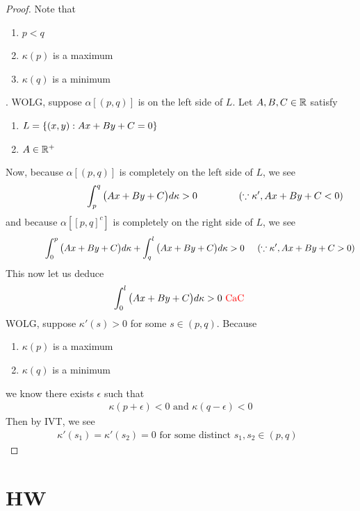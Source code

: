 \documentclass{report}
\begin{document}
\begin{proof}
Note that 
\begin{enumerate}[label=(\alph*)]
  \item $p<q$
  \item $\kappa(p)$ is a maximum 
  \item $\kappa(q)$ is a minimum
\end{enumerate}
. WOLG, suppose $\alpha [(p,q)]$ is on the left side of $L$. Let $A,B,C \in\mathbb{R}$ satisfy 
\begin{enumerate}[label=(\alph*)]
  \item $L=\{ (x,y):Ax+By+C=0 \}$ 
  \item $A\in\mathbb{R}^+$
\end{enumerate}
Now, because $\alpha [(p,q)]$ is completely on the left side of $L$, we see 
\begin{align*}
\hspace{2.5cm}\int_p^q \big(Ax+By+C \big)d\kappa > 0\hspace{1.5cm}(\because \kappa',Ax+By+C<0)
\end{align*}
and because $\alpha [[p,q]^c]$ is completely on the right side of $L$, we see 
\begin{align*}
\hspace{1.5cm}\int_0^p \big(Ax+By+C \big)d\kappa + \int_q^l \big(Ax+By+C \big)d\kappa >0\hspace{0.5cm}(\because \kappa',Ax+By+C>0)
\end{align*}
This now let us deduce 
\begin{align*}
\int_0^l \big(Ax+By+C \big)d\kappa >0 \text{ \textcolor{red}{CaC} }
\end{align*}
WOLG, suppose $\kappa'(s)>0$ for some $s \in (p,q)$. Because 
\begin{enumerate}[label=(\alph*)]
  \item $\kappa(p)$ is a maximum
  \item $\kappa(q)$ is a minimum 
\end{enumerate}
we know there exists $\epsilon $ such that 
\begin{align*}
\kappa(p+\epsilon )<0\text{ and }\kappa(q-\epsilon )<0
\end{align*}
Then by IVT, we see 
\begin{align*}
\kappa'(s_1)=\kappa'(s_2)=0\text{ for some distinct $s_1,s_2 \in (p,q)$  }
\end{align*}

\end{proof}


\chapter{HW}
\end{document}
